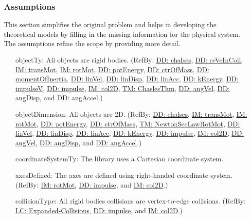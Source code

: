 \documentclass[12pt]{article}
\begin{document}
\subsubsection{Assumptions}
\label{Sec:Assumps}
This section simplifies the original problem and helps in developing the theoretical models by filling in the missing information for the physical system. The assumptions refine the scope by providing more detail.
\begin{itemize}
\item[objectTy:\phantomsection\label{assumpOT}]{All objects are rigid bodies. (RefBy: \hyperref[DD:chalses]{DD: chalses}, \hyperref[DD:reVeInColl]{DD: reVeInColl}, \hyperref[IM:transMot]{IM: transMot}, \hyperref[IM:rotMot]{IM: rotMot}, \hyperref[DD:potEnergy]{DD: potEnergy}, \hyperref[DD:ctrOfMass]{DD: ctrOfMass}, \hyperref[DD:momentOfInertia]{DD: momentOfInertia}, \hyperref[DD:linVel]{DD: linVel}, \hyperref[DD:linDisp]{DD: linDisp}, \hyperref[DD:linAcc]{DD: linAcc}, \hyperref[DD:kEnergy]{DD: kEnergy}, \hyperref[DD:impulseV]{DD: impulseV}, \hyperref[DD:impulse]{DD: impulse}, \hyperref[IM:col2D]{IM: col2D}, \hyperref[TM:ChaslesThm]{TM: ChaslesThm}, \hyperref[DD:angVel]{DD: angVel}, \hyperref[DD:angDisp]{DD: angDisp}, and \hyperref[DD:angAccel]{DD: angAccel}.)}
\item[objectDimension:\phantomsection\label{assumpOD}]{All objects are 2D. (RefBy: \hyperref[DD:chalses]{DD: chalses}, \hyperref[IM:transMot]{IM: transMot}, \hyperref[IM:rotMot]{IM: rotMot}, \hyperref[DD:potEnergy]{DD: potEnergy}, \hyperref[DD:ctrOfMass]{DD: ctrOfMass}, \hyperref[TM:NewtonSecLawRotMot]{TM: NewtonSecLawRotMot}, \hyperref[DD:linVel]{DD: linVel}, \hyperref[DD:linDisp]{DD: linDisp}, \hyperref[DD:linAcc]{DD: linAcc}, \hyperref[DD:kEnergy]{DD: kEnergy}, \hyperref[DD:impulse]{DD: impulse}, \hyperref[IM:col2D]{IM: col2D}, \hyperref[DD:angVel]{DD: angVel}, \hyperref[DD:angDisp]{DD: angDisp}, and \hyperref[DD:angAccel]{DD: angAccel}.)}
\item[coordinateSystemTy:\phantomsection\label{assumpCST}]{The library uses a Cartesian coordinate system.}
\item[axesDefined:\phantomsection\label{assumpAD}]{The axes are defined using right-handed coordinate system. (RefBy: \hyperref[IM:rotMot]{IM: rotMot}, \hyperref[DD:impulse]{DD: impulse}, and \hyperref[IM:col2D]{IM: col2D}.)}
\item[collisionType:\phantomsection\label{assumpCT}]{All rigid bodies collisions are vertex-to-edge collisions. (RefBy: \hyperref[lcEC]{LC: Expanded-Collisions}, \hyperref[DD:impulse]{DD: impulse}, and \hyperref[IM:col2D]{IM: col2D}.)}

\end{itemize}
\end{document}
